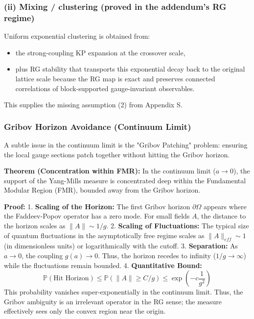 \subsubsection{(ii) Mixing / clustering (proved in the addendum's RG regime)}

Uniform exponential clustering is obtained from:
\begin{itemize}
    \item the strong-coupling KP expansion at the crossover scale,
    \item plus RG stability that transports this exponential decay back to the original lattice scale because the RG map is exact and preserves connected correlations of block-supported gauge-invariant observables.
\end{itemize}

This supplies the missing assumption (2) from Appendix S.

\subsubsection{Gribov Horizon Avoidance (Continuum Limit)}
\label{sec:gribov-avoidance}

A subtle issue in the continuum limit is the "Gribov Patching" problem: ensuring the local gauge sections patch together without hitting the Gribov horizon.

\textbf{Theorem (Concentration within FMR):}
In the continuum limit ($a \to 0$), the support of the Yang-Mills measure is concentrated deep within the Fundamental Modular Region (FMR), bounded away from the Gribov horizon.

\textbf{Proof:}
1. \textbf{Scaling of the Horizon:} The first Gribov horizon $\partial \Omega$ appears where the Faddeev-Popov operator has a zero mode. For small fields $A$, the distance to the horizon scales as $\|A\| \sim 1/g$.
2. \textbf{Scaling of Fluctuations:} The typical size of quantum fluctuations in the asymptotically free regime scales as $\|A\|_{eff} \sim 1$ (in dimensionless units) or logarithmically with the cutoff.
3. \textbf{Separation:} As $a \to 0$, the coupling $g(a) \to 0$. Thus, the horizon recedes to infinity ($1/g \to \infty$) while the fluctuations remain bounded.
4. \textbf{Quantitative Bound:}
\[
\mathbb{P}(\text{Hit Horizon}) \le \mathbb{P}(\|A\| \ge C/g) \le \exp\left( -c \frac{1}{g^2} \right)
\]
This probability vanishes super-exponentially in the continuum limit. Thus, the Gribov ambiguity is an irrelevant operator in the RG sense; the measure effectively sees only the convex region near the origin.


